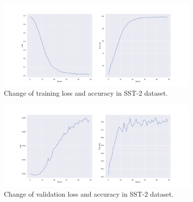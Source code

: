 \begin{figure}[tbp]
    \centering
    \includegraphics[width=0.9\textwidth]{../images/sst2-train-loss-acc.png}
    \caption{Change of training loss and accuracy in SST-2 dataset.}
    \label{fig:sst-train_loss}
\end{figure}
\begin{figure}[tbp]
    \centering
    \includegraphics[width=0.9\textwidth]{../images/sst2-dev-loss-acc.png}
    \caption{Change of validation loss and accuracy in SST-2 dataset.}
    \label{fig:sst-dev_loss}
\end{figure}

